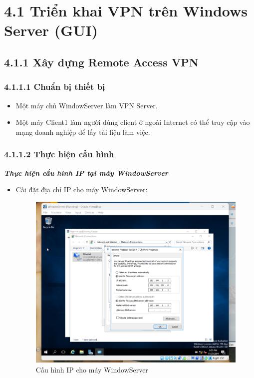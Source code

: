 \vspace{-0.5cm}
\section*{4.1 Triển khai VPN trên Windows Server (GUI)}


 \subsection*{4.1.1 Xây dựng Remote Access VPN}

\subsubsection*{4.1.1.1 Chuẩn bị thiết bị}

 \begin{itemize}
     \item Một máy chủ WindowServer làm VPN Server.
     \item Một máy Client1 làm người dùng client ở ngoài Internet có thể truy cập vào mạng doanh nghiệp để lấy tài liệu làm việc.
 \end{itemize}

\subsubsection*{4.1.1.2 Thực hiện cấu hình}

 \textbf{\textit{Thực hiện cấu hình IP tại máy WindowServer}}
 
  \begin{itemize}
      \item Cài đặt địa chỉ IP cho máy WindowServer:
      
      \begin{figure}[htbp]
        \centering
        \includegraphics[width=0.5\linewidth]{RemoteAccessVPNimg/setIP_Server.png}
        \caption{Cấu hình IP cho máy WindowServer}
    \end{figure}
 \end{itemize}


